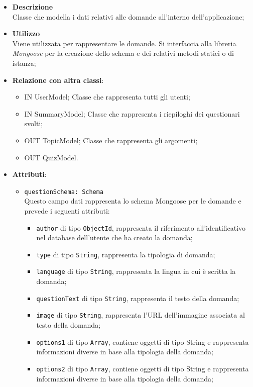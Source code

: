 	\begin{itemize}
		\item \textbf{Descrizione} \\
		Classe che modella i dati relativi alle domande all'interno dell'applicazione;	
		\item \textbf{Utilizzo} \\
		Viene utilizzata per rappresentare le domande. Si interfaccia alla libreria \textit{Mongoose} per la creazione dello schema e dei relativi metodi statici o di istanza;
		\item \textbf{Relazione con altra classi}:
			\begin{itemize}
			\item IN UserModel;
			Classe che rappresenta tutti gli utenti;
			\item IN SummaryModel;
			Classe che rappresenta i riepiloghi dei questionari svolti;
			\item OUT TopicModel;
			Classe che rappresenta gli argomenti;
			\item OUT QuizModel.
			\end{itemize}
		\item \textbf{Attributi}:
	\begin{itemize}
		\item \texttt{questionSchema: Schema} \\
		Questo campo dati rappresenta lo schema Mongoose per le domande e prevede i seguenti attributi:
		\begin{itemize}
			\item \texttt{author} di tipo \texttt{ObjectId}, rappresenta il riferimento all'identificativo nel database dell'utente che ha creato la domanda;
			\item \texttt{type} di tipo \texttt{String}, rappresenta la tipologia di domanda;
			\item \texttt{language} di tipo \texttt{String}, rappresenta la lingua in cui è scritta la domanda; 
			\item \texttt{questionText} di tipo \texttt{String}, rappresenta il testo della domanda; 
			\item \texttt{image} di tipo \texttt{String}, rappresenta l'URL dell'immagine associata al testo della domanda;
			\item \texttt{options1} di tipo \texttt{Array}, contiene oggetti di tipo String e rappresenta informazioni diverse in base alla tipologia della	 domanda;
			\item \texttt{options2} di tipo \texttt{Array}, contiene oggetti di tipo String e rappresenta informazioni diverse in base alla tipologia della	 domanda;

\end{itemize}
\end{itemize}
\end{itemize}
